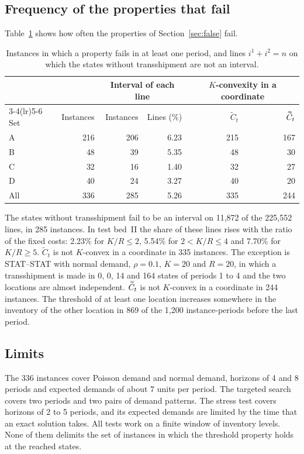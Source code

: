 \documentclass[11pt]{article}
\DeclareRobustCommand{\dbtilde}[1]{\accentset{\approx}{#1}}
\newcommand{\Ct}{\widetilde{C}}
\newcommand{\Cq}{\dbtilde{C}}
\theoremstyle{definition}
\begin{document}
\subsection{Frequency of the properties that fail}

Table~\ref{tab:fail} shows how often the properties of Section~\ref{sec:false} fail.

\begin{table}[h]
\centering
\small
\setlength{\tabcolsep}{5pt}
\caption{Instances in which a property fails in at least one period, and lines $i^1+i^2=n$ on which the states without transshipment are not an interval.}\label{tab:fail}
\begin{tabular}{lrrrrr}
\toprule
 & & \multicolumn{2}{c}{Interval of each line} & \multicolumn{2}{c}{$K$-convexity in a coordinate} \\
\cmidrule(lr){3-4}\cmidrule(lr){5-6}
Set & Instances & Instances & Lines (\%) & $\Ct_t$ & $\Cq_t$ \\
\midrule
A & 216 & 206 & 6.23 & 215 & 167 \\
B & 48 & 39 & 5.35 & 48 & 30 \\
C & 32 & 16 & 1.40 & 32 & 27 \\
D & 40 & 24 & 3.27 & 40 & 20 \\
\midrule
All & 336 & 285 & 5.26 & 335 & 244 \\
\bottomrule
\end{tabular}
\end{table}

The states without transshipment fail to be an interval on 11,872 of the 225,552 lines, in 285 instances. In test bed~II the share of these lines rises with the ratio of the fixed costs: 2.23\% for $K/R\le2$, 5.54\% for $2<K/R\le4$ and 7.70\% for $K/R\ge5$. $\Ct_t$ is not $K$-convex in a coordinate in 335 instances. The exception is STAT--STAT with normal demand, $\rho=0.1$, $K=20$ and $R=20$, in which a transshipment is made in 0, 0, 14 and 164 states of periods 1 to 4 and the two locations are almost independent. $\Cq_t$ is not $K$-convex in a coordinate in 244 instances. The threshold of at least one location increases somewhere in the inventory of the other location in 869 of the 1,200 instance-periods before the last period.

\subsection{Limits}

The 336 instances cover Poisson demand and normal demand, horizons of 4 and 8 periods and expected demands of about 7 units per period. The targeted search covers two periods and two pairs of demand patterns. The stress test covers horizons of 2 to 5 periods, and its expected demands are limited by the time that an exact solution takes. All tests work on a finite window of inventory levels. None of them delimits the set of instances in which the threshold property holds at the reached states.
\end{document}
